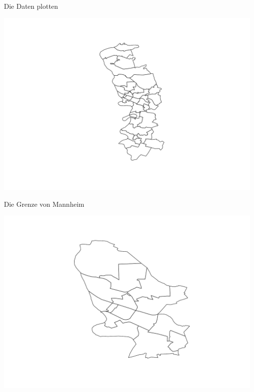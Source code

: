 \documentclass[ignorenonframetext,]{beamer}
\begin{document}
\begin{frame}{Die Daten plotten}
\protect\hypertarget{die-daten-plotten}{}

\includegraphics{Shapefiles_files/figure-beamer/unnamed-chunk-11-1.pdf}

\end{frame}

\begin{frame}{Die Grenze von Mannheim}
\protect\hypertarget{die-grenze-von-mannheim}{}

\includegraphics{Shapefiles_files/figure-beamer/unnamed-chunk-12-1.pdf}

\end{frame}
\end{document}
